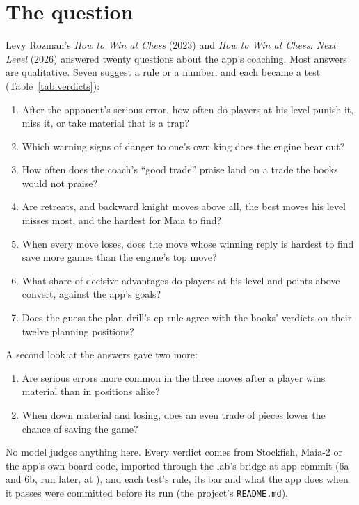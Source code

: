 \documentclass[11pt]{article}
\begin{document}
\section{The question}

Levy Rozman's \emph{How to Win at Chess} (2023) and \emph{How to Win at Chess: Next Level} (2026)
answered twenty questions about the app's coaching. Most answers are qualitative. Seven suggest a
rule or a number, and each became a test (Table~\ref{tab:verdicts}):
\begin{enumerate}[nosep,label=\textbf{1\alph*}]
\item After the opponent's serious error, how often do players at his level punish it, miss it, or
take material that is a trap?
\item Which warning signs of danger to one's own king does the engine bear out?
\item How often does the coach's ``good trade'' praise land on a trade the books would not praise?
\item Are retreats, and backward knight moves above all, the best moves his level misses most, and
the hardest for Maia to find?
\item When every move loses, does the move whose winning reply is hardest to find save more games
than the engine's top move?
\item What share of decisive advantages do players at his level and \LookAbove{} points above
convert, against the app's goals?
\item Does the guess-the-plan drill's \PlanMargin{} cp rule agree with the books' verdicts on their
twelve planning positions?
\end{enumerate}
A second look at the answers gave two more:
\begin{enumerate}[nosep,label=\textbf{6\alph*}]
\item Are serious errors more common in the three moves after a player wins material than in
positions alike?
\item When down material and losing, does an even trade of pieces lower the chance of saving the
game?
\end{enumerate}
No model judges anything here. Every verdict comes from Stockfish, Maia-2 or the app's own board
code, imported through the lab's bridge at app commit \texttt{\AppCommit} (6a and 6b, run later, at
\texttt{\LaterAppCommit}), and each test's rule, its bar and what the app does when it passes were
committed before its run (the project's \texttt{README.md}).
\end{document}
